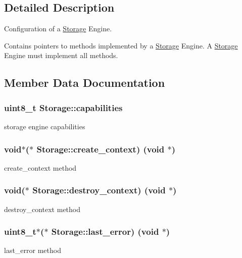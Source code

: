 \subsection{Detailed Description}
Configuration of a \hyperlink{struct_storage}{Storage} Engine. 

Contains pointers to methods implemented by a \hyperlink{struct_storage}{Storage} Engine. A \hyperlink{struct_storage}{Storage} Engine must implement all methods. 

\subsection{Member Data Documentation}
\hypertarget{struct_storage_a7b4013010f2549531d066e6d701c69d9}{}
\subsubsection[{capabilities}]{\setlength{\rightskip}{0pt plus 5cm}uint8\+\_\+t Storage\+::capabilities}\label{struct_storage_a7b4013010f2549531d066e6d701c69d9}
storage engine capabilities \hypertarget{struct_storage_a96d6e9b9bfd5b4943eb9660ca2293447}{}
\subsubsection[{create\+\_\+context}]{\setlength{\rightskip}{0pt plus 5cm}void$\ast$($\ast$ Storage\+::create\+\_\+context) (void $\ast$)}\label{struct_storage_a96d6e9b9bfd5b4943eb9660ca2293447}
create\+\_\+context method \hypertarget{struct_storage_af425b1971a9fcfed315e6aec547df8da}{}
\subsubsection[{destroy\+\_\+context}]{\setlength{\rightskip}{0pt plus 5cm}void($\ast$ Storage\+::destroy\+\_\+context) (void $\ast$)}\label{struct_storage_af425b1971a9fcfed315e6aec547df8da}
destroy\+\_\+context method \hypertarget{struct_storage_a8d06a225bc4d31d734cab75608fa3cf3}{}
\subsubsection[{last\+\_\+error}]{\setlength{\rightskip}{0pt plus 5cm}uint8\+\_\+t$\ast$($\ast$ Storage\+::last\+\_\+error) (void $\ast$)}\label{struct_storage_a8d06a225bc4d31d734cab75608fa3cf3}
last\+\_\+error method \hypertarget{struct_storage_a5e24b45fef757acae34cca3bb8464935}{}
